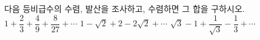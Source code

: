 다음 등비급수의 수렴, 발산을 조사하고, 수렴하면 그 합을 구하시오.
 $1+\dfrac{2}{3}+\dfrac{4}{9}+\dfrac{8}{27}+\cdots$
 $1-\sqrt{2}+2-2\sqrt{2}+\cdots$
 $\sqrt{3}-1+\dfrac{1}{\sqrt{3}}-\dfrac{1}{3}+\cdots$
